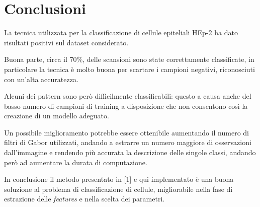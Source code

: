 \section{Conclusioni}

La tecnica utilizzata per la classificazione di cellule epiteliali HEp-2 ha dato risultati positivi sul dataset considerato.

Buona parte, circa il 70\%, delle scansioni sono state correttamente classificate, in particolare la tecnica è molto buona per scartare i campioni negativi, riconosciuti con un'alta accuratezza.

Alcuni dei pattern sono però difficilmente classificabili: questo a causa anche del basso numero di campioni di training a disposizione che non consentono così la creazione di un modello adeguato.

Un possibile miglioramento potrebbe essere ottenibile aumentando il numero di filtri di Gabor utilizzati, andando a estrarre un numero maggiore di osservazioni dall'immagine e rendendo più accurata la descrizione delle singole classi, andando però ad aumentare la durata di computazione.

In conclusione il metodo presentato in [1] e qui implementato è una buona soluzione al problema di classificazione di cellule, migliorabile nella fase di estrazione delle \emph{features} e nella scelta dei parametri.